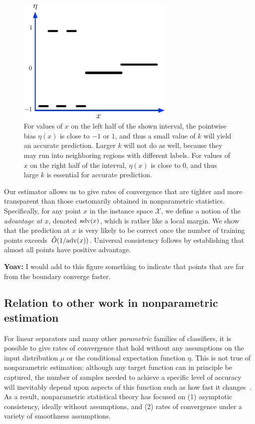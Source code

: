 \documentclass{article}
\def\X{{\mathcal X}}
\def\adv{{\rm adv}}
\begin{document}
\begin{figure}
\begin{center}
\includegraphics[width=3in]{figs/adaptive-rationale.pdf}
\end{center}
\caption{For values of $x$ on the left half of the shown interval, the
  pointwise bias $\eta(x)$ is close to $-1$ or $1$, and thus a small value of $k$ will yield an accurate prediction. Larger $k$ will not do as well, because they may run into neighboring regions with different labels. For values of $x$ on the right half of the interval, $\eta(x)$ is close to $0$, and thus large $k$ is essential for accurate prediction.}
\label{fig:rationale}
\end{figure}

Our estimator allows us to give rates of convergence that are tighter and more 
transparent than those customarily obtained in nonparametric statistics. Specifically, for any point $x$ in the instance space $\X$, we define a notion of the {\it advantage at $x$}, denoted $\adv(x)$, which is rather like a local margin. We show that the prediction at $x$ is very likely to be correct once the number of training points exceeds~$\tilde{O}(1/\adv(x))$. Universal consistency follows by establishing that almost all points have positive advantage.

{\bf Yoav:} I would add to this figure something to indicate that
points that are far from the boundary converge faster.
  
\subsection{Relation to other work in nonparametric estimation}

For linear separators and many other {\it parametric} families of classifiers, it is possible to give rates of convergence that hold without any assumptions on the input distribution $\mu$ or the conditional expectation function $\eta$. This is not true of nonparametric estimation: although any target function can in principle be captured, the number of samples needed to achieve a specific level of accuracy will inevitably depend upon aspects of this function such as how fast it changes~\cite[chapter 7]{DGL96}. As a result, nonparametric statistical theory has focused on (1) asymptotic consistency, ideally without assumptions, and (2) rates of convergence under a variety of smoothness assumptions.
\end{document}
